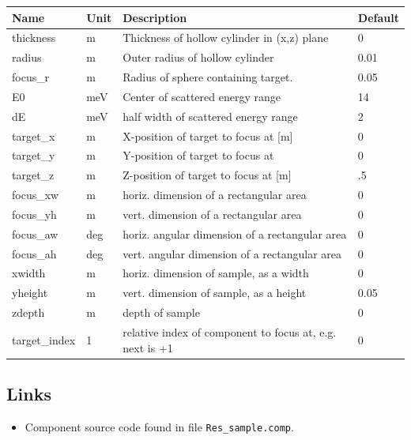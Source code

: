 \begin{longtable}{p{}p{}p{}p{}}
\toprule
\textbf{Name} & \textbf{Unit} & \textbf{Description} & \textbf{Default} \\
\midrule
\endhead
thickness & m & Thickness of hollow cylinder in (x,z) plane & 0 \\
radius & m & Outer radius of hollow cylinder & 0.01 \\
focus\_r & m & Radius of sphere containing target. & 0.05 \\
E0 & meV & Center of scattered energy range & 14 \\
dE & meV & half width of scattered energy range & 2 \\
target\_x & m & X-position of target to focus at [m] & 0 \\
target\_y & m & Y-position of target to focus at & 0 \\
target\_z & m & Z-position of target to focus at [m] & .5 \\
focus\_xw & m & horiz. dimension of a rectangular area & 0 \\
focus\_yh & m & vert. dimension of a rectangular area & 0 \\
focus\_aw & deg & horiz. angular dimension of a rectangular area & 0 \\
focus\_ah & deg & vert. angular dimension of a rectangular area & 0 \\
xwidth & m & horiz. dimension of sample, as a width & 0 \\
yheight & m & vert. dimension of sample, as a height & 0.05 \\
zdepth & m & depth of sample & 0 \\
target\_index & 1 & relative index of component to focus at, e.g. next is +1 & 0 \\
\bottomrule
\end{longtable}

\subsection*{Links}
\begin{itemize}
  \item Component source code found in file \texttt{Res\_sample.comp}.
\end{itemize}
